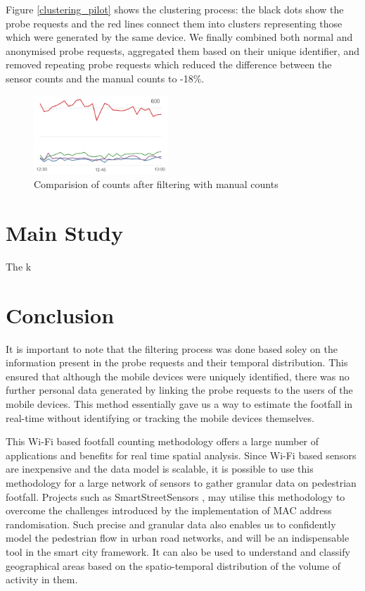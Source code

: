 \documentclass[11t, a4paper, twocolumn]{article}
\begin{document}
		Figure \ref{clustering_pilot} shows the clustering process: the black dots show the probe requests and the red lines connect them into clusters representing those which were generated by the same device.
		We finally combined both normal and anonymised probe requests, aggregated them based on their unique identifier, and removed repeating probe requests which reduced the difference between the sensor counts and the manual counts to -18\%.
	
		\begin{figure}
			\begin{center}
				\includegraphics [width=0.45\textwidth] {outputs/pilot_counts_comparision.png}
				\caption{Comparision of counts after filtering with manual counts}
				\label{comparision_pilot}
			\end{center}
		\end{figure}

	\section{Main Study}
		The k

	\section{Conclusion}
		It is important to note that the filtering process was done based soley on the information present in the probe requests and their temporal distribution.
		This ensured that although the mobile devices were uniquely identified, there was no further personal data generated by linking the probe requests to the users of the mobile devices.
		This method essentially gave us a way to estimate the footfall in real-time without identifying or tracking the mobile devices themselves.

		This Wi-Fi based footfall counting methodology offers a large number of applications and benefits for real time spatial analysis.
		Since Wi-Fi based sensors are inexpensive and the data model is scalable, it is possible to use this methodology for a large network of sensors to gather granular data on pedestrian footfall.
		Projects such as SmartStreetSensors \citep{sss2016}, may utilise this methodology to overcome the challenges introduced by the implementation of MAC address randomisation.
		Such precise and granular data also enables us to confidently model the pedestrian flow in urban road networks, and will be an indispensable tool in the smart city framework.
		It can also be used to understand and classify geographical areas based on the spatio-temporal distribution of the volume of activity in them.

	\printbibliography[title={References}]
\end{document}
